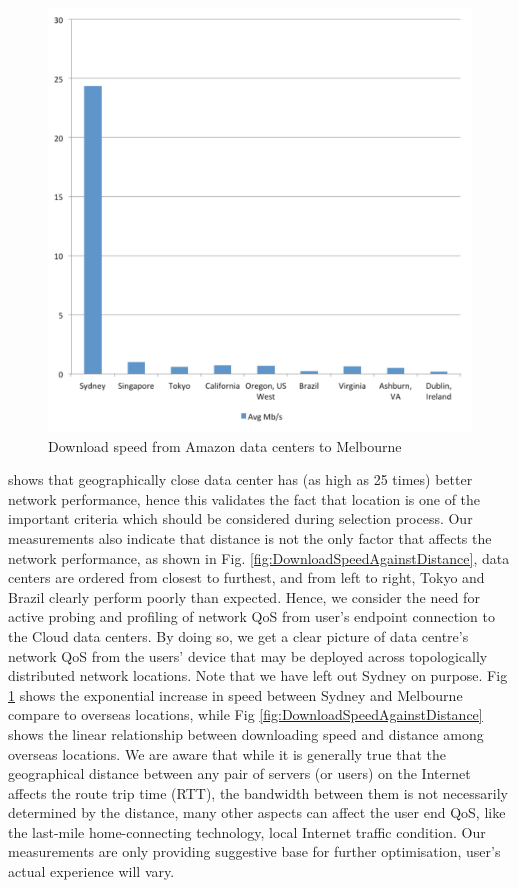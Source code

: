 \begin{figure}[!ht]
 \centering
 \includegraphics[width=\textwidth,keepaspectratio]{Figures/QoS/figure5.pdf}
 \caption{Download speed from Amazon data centers to Melbourne}
\label{fig:DownloadSpeedFromAmazonToMelbourne}
\end{figure}

 shows that geographically close data center has (as high as 25 times) better network performance, hence this validates the fact that location is one of the important criteria which should be considered during selection process. Our measurements also indicate that distance is not the only factor that affects the network performance, as shown in Fig. \ref{fig:DownloadSpeedAgainstDistance}, data centers are ordered from closest to furthest, and from left to right, Tokyo and Brazil clearly perform poorly than expected. Hence, we consider the need for active probing and profiling of network QoS from user's endpoint connection to the Cloud data centers. By doing so, we get a clear picture of data centre's network QoS from the users' device that may be deployed across topologically distributed network locations. Note that we have left out Sydney on purpose. Fig \ref{fig:DownloadSpeedFromAmazonToMelbourne} shows the exponential increase in speed between Sydney and Melbourne compare to overseas locations, while Fig \ref{fig:DownloadSpeedAgainstDistance} shows the linear relationship between downloading speed and distance among overseas locations. We are aware that while it is generally true that the geographical distance between any pair of servers (or users) on the Internet affects the route trip time (RTT), the bandwidth between them is not necessarily determined by the distance, many other aspects can affect the user end QoS, like the last-mile home-connecting technology, local Internet traffic condition. Our measurements are only providing suggestive base for further optimisation, user's actual experience will vary.

